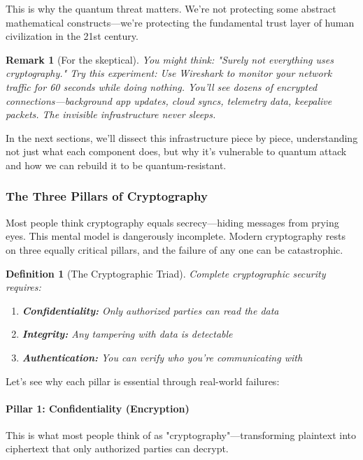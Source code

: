 \documentclass[11pt,a4paper]{article}
\newtheorem{definition}{Definition}
\newtheorem{remark}{Remark}
\begin{document}
This is why the quantum threat matters. We're not protecting some abstract mathematical constructs---we're protecting the fundamental trust layer of human civilization in the 21st century.

\begin{remark}[For the skeptical]
You might think: "Surely not \emph{everything} uses cryptography." Try this experiment: Use Wireshark to monitor your network traffic for 60 seconds while doing nothing. You'll see dozens of encrypted connections---background app updates, cloud syncs, telemetry data, keepalive packets. The invisible infrastructure never sleeps.
\end{remark}

In the next sections, we'll dissect this infrastructure piece by piece, understanding not just what each component does, but why it's vulnerable to quantum attack and how we can rebuild it to be quantum-resistant.

\subsubsection{The Three Pillars of Cryptography}

Most people think cryptography equals secrecy---hiding messages from prying eyes. This mental model is dangerously incomplete. Modern cryptography rests on three equally critical pillars, and the failure of any one can be catastrophic.

\begin{definition}[The Cryptographic Triad]
Complete cryptographic security requires:
\begin{enumerate}
    \item \textbf{Confidentiality:} Only authorized parties can read the data
    \item \textbf{Integrity:} Any tampering with data is detectable  
    \item \textbf{Authentication:} You can verify who you're communicating with
\end{enumerate}
\end{definition}

Let's see why each pillar is essential through real-world failures:

\paragraph{Pillar 1: Confidentiality (Encryption)}

This is what most people think of as "cryptography"---transforming plaintext into ciphertext that only authorized parties can decrypt.
\end{document}
